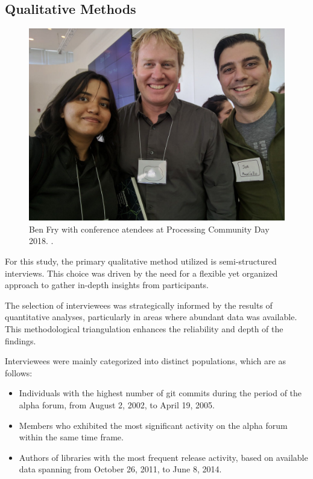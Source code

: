 \documentclass[draft]{article}
\begin{document}
\subsection{Qualitative Methods}
\begin{figure}[H]
  \begin{minipage}{\textwidth}
    \includegraphics[width=\linewidth]{images/pcd2018.jpg}
    \caption[Ben Fry at PCD 2018]{Ben Fry with conference atendees at Processing Community Day 2018. .}
    \label{fig:benFry}
    
  \end{minipage}
\end{figure}

For this study, the primary qualitative method utilized is semi-structured interviews. This choice was driven by the need for a flexible yet organized approach to gather in-depth insights from participants.

The selection of interviewees was strategically informed by the results of quantitative analyses, particularly in areas where abundant data was available. This methodological triangulation enhances the reliability and depth of the findings.

Interviewees were mainly categorized into distinct populations, which are as follows:

\begin{itemize}
    \item Individuals with the highest number of git commits during the period of the alpha forum, from August 2, 2002, to April 19, 2005.
    \item Members who exhibited the most significant activity on the alpha forum within the same time frame.
    \item Authors of libraries with the most frequent release activity, based on available data spanning from October 26, 2011, to June 8, 2014.
\end{itemize}
\end{document}
